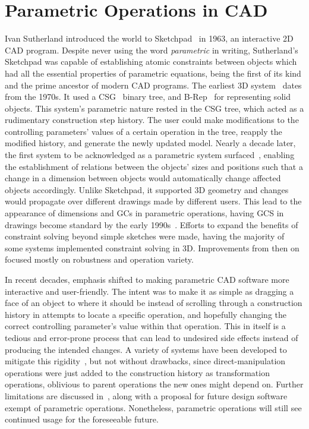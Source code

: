\section{Parametric Operations in CAD}%
\label{sec:intro.parametric}

Ivan Sutherland introduced the world to
Sketchpad~\cite{Sutherland:1964:Sketchpad} in 1963, an interactive 2D \ac{CAD}
program. Despite never using the word \textit{parametric} in writing,
Sutherland's Sketchpad was capable of establishing atomic constraints between
objects which had all the essential properties of parametric equations, being
the first of its kind and the prime ancestor of modern \ac{CAD} programs.  The
earliest 3D system~\cite{Requicha:1980:RRS:356827.356833} dates from the 1970s.
It used a \ac{CSG}~\cite{Requicha:1977:CSG,Foley:1996:CGPP} binary tree, and
\ac{B-Rep}~\cite{Stroud:2006:BRMT} for representing solid objects.  This
system's parametric nature rested in the \ac{CSG} tree, which acted as a
rudimentary construction step history.  The user could make modifications to the
controlling parameters' values of a certain operation in the tree, reapply the
modified history, and generate the newly updated model.  Nearly a decade later,
the first system to be acknowledged as a parametric system
surfaced~\cite{PTC:1980:ProENGINEER,Jabi:2013:PDA}, enabling the establishment
of relations between the objects' sizes and positions such that a change in a
dimension between objects would automatically change affected objects
accordingly.  Unlike Sketchpad, it supported 3D geometry and changes would
propagate over different drawings made by different users.  This lead to the
appearance of dimensions and \acp{GC} in parametric operations, having \ac{GCS}
in drawings become standard by the early
1990s~\cite{Chung:1990:TEVPD,Owen:1991:ASGDC,Bouma:1995:GCS}.  Efforts to expand
the benefits of constraint solving beyond simple sketches were made, having the
majority of some systems implemented constraint solving in 3D.  Improvements
from then on focused mostly on robustness and operation variety.

In recent decades, emphasis shifted to making parametric \ac{CAD} software more
interactive and user-friendly.  The intent was to make it as simple as dragging
a face of an object to where it should be instead of scrolling through a
construction history in attempts to locate a specific operation, and hopefully
changing the correct controlling parameter's value within that operation.  This
in itself is a tedious and error-prone process that can lead to undesired
side effects instead of producing the intended changes.  A variety of systems
have been developed to mitigate this
rigidity~\cite{Samuel:2006:CPPUP,Wu:2007:MSMSM,Clarke:2009:SM}, but not without
drawbacks, since direct-manipulation operations were just added to the
construction history as transformation operations, oblivious to parent
operations the new ones might depend on.  Further limitations are discussed
in~\cite{Bettig:2005:LPOSSD}, along with a proposal for future design software
exempt of parametric operations.  Nonetheless, parametric operations will still
see continued usage for the foreseeable future.
